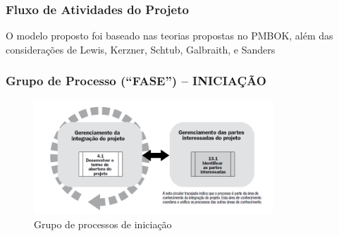   \begin{frame}
 \frametitle{Fluxo de Atividades do Projeto}
  \begin{block}{}
   O modelo proposto foi baseado nas teorias propostas no PMBOK, além das considerações de Lewis, Kerzner, Schtub, Galbraith, e Sanders
  \end{block}
\end{frame}

      \begin{frame}
   \frametitle{Grupo de Processo (“FASE”) – INICIAÇÃO}
    \begin{figure}
  \centering
  \includegraphics[width = 0.8\textwidth]{figs/fig1_17.png}
  \caption{Grupo de processos de iniciação}
 \end{figure}
  \end{frame}
  
